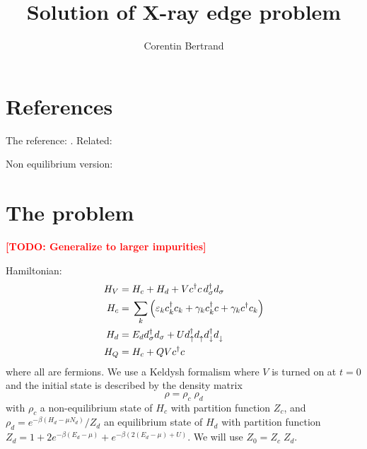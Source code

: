 \documentclass[12pt]{article}
\newcommand\TODO[1]{\textcolor{red}{\textbf{[TODO: #1]}}}
\newcommand\up{\uparrow}
\newcommand\dn{\downarrow}
\newcommand\nodag{{\vphantom{\dagger}}}
\begin{document}
\title{Solution of X-ray edge problem}
\author{Corentin Bertrand}

\maketitle




\begin{acronym}
\end{acronym}

\section{References}

The reference: \cite{NozieresDeDominicis1969}. Related: \cite{Roulet1969, NozieresRoulet1969}

Non equilibrium version: \cite{Aleiner1997}

\section{The problem}

\TODO{Generalize to larger impurities}

Hamiltonian:
\begin{align}
	H_V ={}& H_c + H_d + V c^\dagger c \, d_\sigma^\dagger d_\sigma
	\\
	H_c ={}& \sum_k \qty( \varepsilon_k c_k^\dagger c_k + \gamma_k c_k^\dagger c + \gamma_k c^\dagger c_k)
	\\
	H_d ={}& E_d d_\sigma^\dagger d_\sigma + U d_\up^\dag d_\up^\nodag d_\dn^\dag d_\dn^\nodag
	\\
	H_Q ={}& H_c + QV c^\dag c
\end{align}
where all are fermions. We use a Keldysh formalism where $V$ is turned on at $t=0$ and the initial state is described by the density matrix
\begin{equation}
	\rho = \rho_c \; \rho_d
\end{equation}
with $\rho_c$ a non-equilibrium state of $H_c$ with partition function $Z_c$, and $\rho_d = e^{-\beta(H_d - \mu N_d)} / Z_d$ an equilibrium state of $H_d$ with partition function $Z_d = 1 + 2e^{-\beta(E_d - \mu)} + e^{-\beta(2(E_d - \mu) + U)}$. We will use $Z_0 = Z_c \; Z_d$.
\end{document}
